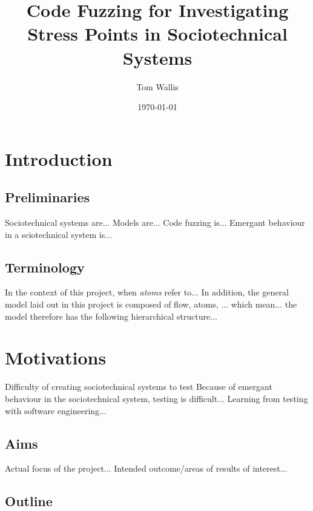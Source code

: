 \documentclass[a4paper]{l4proj}
\begin{document}
\title{Code Fuzzing for Investigating Stress Points in Sociotechnical Systems}  %
\author{Tom Wallis}
\date{\today}
\maketitle

\begin{abstract}

\end{abstract}

\educationalconsent
\tableofcontents

\chapter{Introduction}
\label{intro}

\section{Preliminaries}
\label{preliminaries}
Sociotechnical systems are...
Models are...
Code fuzzing is...
Emergant behaviour in a sciotechnical system is...

\section{Terminology}
\label{introducing_technology}
In the context of this project, when \emph{atoms} refer to...
In addition, the general model laid out in this project is composed of flow, atoms, ... which mean... the model therefore has the following hierarchical structure...

\chapter{Motivations}
\label{motivations}
Difficulty of creating sociotechnical systems to test
Because of emergant behaviour in the sociotechnical system, testing is difficult...
Learning from testing with software engineering...


\section{Aims}
\label{aims}
Actual focus of the project...
Intended outcome/areas of results of interest...


\section{Outline}
\label{outline}
\end{document}
